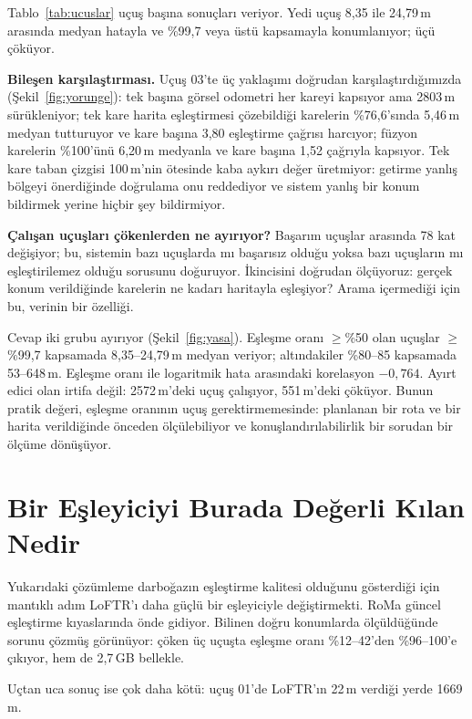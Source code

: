 \documentclass[conference]{IEEEtran}
\begin{document}
Tablo~\ref{tab:ucuslar} uçuş başına sonuçları veriyor. Yedi uçuş 8,35 ile
24,79\,m arasında medyan hatayla ve \%99,7 veya üstü kapsamayla konumlanıyor;
üçü çöküyor.

\textbf{Bileşen karşılaştırması.} Uçuş 03'te üç yaklaşımı doğrudan
karşılaştırdığımızda (Şekil~\ref{fig:yorunge}): tek başına görsel odometri her
kareyi kapsıyor ama 2803\,m sürükleniyor; tek kare harita eşleştirmesi
çözebildiği karelerin \%76,6'sında 5,46\,m medyan tutturuyor ve kare başına
3,80 eşleştirme çağrısı harcıyor; füzyon karelerin \%100'ünü 6,20\,m medyanla
ve kare başına 1,52 çağrıyla kapsıyor. Tek kare taban çizgisi 100\,m'nin
ötesinde kaba aykırı değer üretmiyor: getirme yanlış bölgeyi önerdiğinde
doğrulama onu reddediyor ve sistem yanlış bir konum bildirmek yerine hiçbir şey
bildirmiyor.

\textbf{Çalışan uçuşları çökenlerden ne ayırıyor?} Başarım uçuşlar arasında
78 kat değişiyor; bu, sistemin bazı uçuşlarda mı başarısız olduğu yoksa bazı
uçuşların mı eşleştirilemez olduğu sorusunu doğuruyor. İkincisini doğrudan
ölçüyoruz: gerçek konum verildiğinde karelerin ne kadarı haritayla eşleşiyor?
Arama içermediği için bu, verinin bir özelliği.

Cevap iki grubu ayırıyor (Şekil~\ref{fig:yasa}). Eşleşme oranı $\geq$\%50 olan
uçuşlar $\geq$\%99,7 kapsamada 8,35--24,79\,m medyan veriyor; altındakiler
\%80--85 kapsamada 53--648\,m. Eşleşme oranı ile logaritmik hata arasındaki
korelasyon $-0{,}764$. Ayırt edici olan irtifa değil: 2572\,m'deki uçuş
çalışıyor, 551\,m'deki çöküyor. Bunun pratik değeri, eşleşme oranının uçuş
gerektirmemesinde: planlanan bir rota ve bir harita verildiğinde önceden
ölçülebiliyor ve konuşlandırılabilirlik bir sorudan bir ölçüme dönüşüyor.

\section{Bir Eşleyiciyi Burada Değerli Kılan Nedir}
\label{sec:esleyici}

Yukarıdaki çözümleme darboğazın eşleştirme kalitesi olduğunu gösterdiği için
mantıklı adım LoFTR'ı daha güçlü bir eşleyiciyle değiştirmekti. RoMa güncel
eşleştirme kıyaslarında önde gidiyor. Bilinen doğru konumlarda ölçüldüğünde
sorunu çözmüş görünüyor: çöken üç uçuşta eşleşme oranı \%12--42'den
\%96--100'e çıkıyor, hem de 2,7\,GB bellekle.

Uçtan uca sonuç ise çok daha kötü: uçuş 01'de LoFTR'ın 22\,m verdiği yerde
1669\,m.
\end{document}

